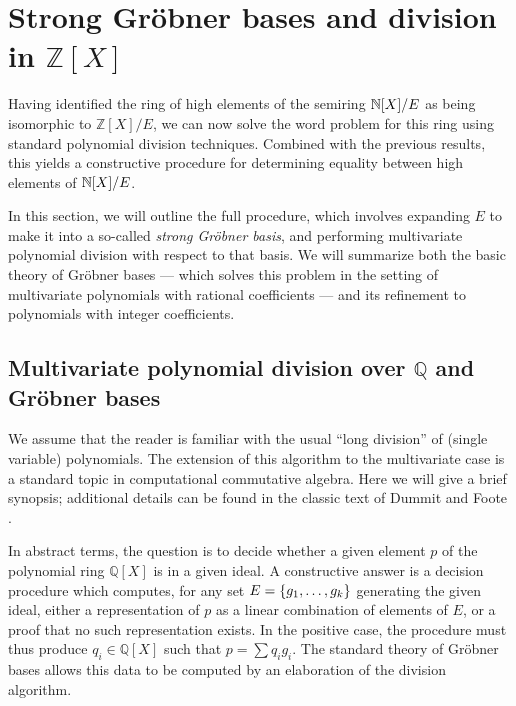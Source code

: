 \documentclass[numbers=enddot]{scrartcl}
\newcommand{\ints}{\mathbb{Z}}
\newcommand{\rats}{\mathbb{Q}}
\begin{document}
\section{Strong Gr\"obner bases and division in $\ints[X]$}

\newcommand{\seqof}[1]{{\left\langle{#1}\right\rangle}}
\newcommand{\dvsr}[1]{\multicolumn{1}{@{}r@{\quad}|}{#1}}

Having identified the ring of high elements of the semiring $\mathbb{N}[X]/E$ as being 
isomorphic to $\ints[X]/E$, we can now solve the word problem for this ring 
using standard polynomial division techniques. Combined with the previous results,
this yields a constructive procedure 
for determining equality between high elements of $\mathbb{N}[X]/E$.

In this section, we will outline the full procedure, which involves expanding $E$ to make it into a so-called
\emph{strong Gr\"obner basis}, and performing multivariate polynomial division with respect to that basis.
We will summarize both the basic theory of Gr\"obner bases --- which solves this problem in the setting of multivariate 
polynomials with rational coefficients --- and its refinement to polynomials with integer coefficients.

\subsection{Multivariate polynomial division over $\mathbb{Q}$ and Gr\"obner bases}

We assume that the reader is familiar with the usual ``long division'' of (single variable) polynomials.
The extension of this algorithm to the multivariate case is a standard topic in 
computational commutative algebra. Here we will give a brief synopsis; additional details can 
be found in the classic text of Dummit and Foote \cite[Ch.\ 9.6]{DF}.

In abstract terms, the question is to decide whether a given element $p$ of the 
polynomial ring $\rats[X]$ is in a given ideal.
A constructive answer is a decision procedure which computes, for any set 
 $E = \left\{g_1,\dots,g_k\right\}$ generating the given ideal,
 either a representation of $p$ as a linear combination of elements of $E$, 
 or a proof that no such representation exists. 
 In the positive case, the procedure must thus produce $q_i \in \rats[X]$ such that $p = \sum q_i g_i$. 
 The standard theory of Gr\"obner bases allows this data to be computed by an elaboration of the 
 division algorithm.
\end{document}
